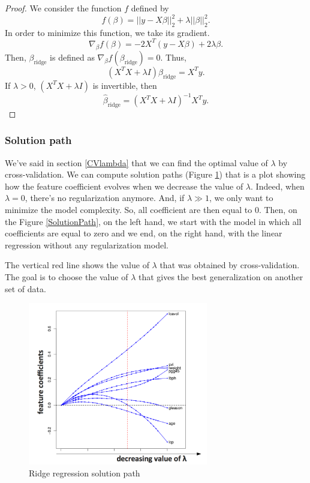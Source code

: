 \documentclass[a4paper,12pt]{article}
\begin{document}
\begin{proof}
We consider the function $f$ defined by
\[ f(\beta) = ||y - X\beta||_2^2 + \lambda ||\beta||_2^2.\]
In order to minimize this function, we take its gradient.
\[ \nabla_{\beta}f(\beta) = -2X^T (y-X\beta) + 2\lambda \beta.\]
Then, $\beta_\text{ridge}$ is defined as $\nabla_{\beta}f(\beta_{\text{ridge}}) = 0$. Thus,
\[ (X^TX+\lambda I)\beta_\text{ridge} = X^T y.\]
If $\lambda > 0$, $(X^T X + \lambda I)$ is invertible, then
\[ \hat{\beta}_\text{ridge} = (X^T X+ \lambda I)^{-1} X^T y. \]
\end{proof}

\subsubsection{Solution path}
\label{SectionSolutionPathRR}
We've said in section \ref{CVlambda} that we can find the optimal value of $\lambda$ by cross-validation. We can compute solution paths (Figure \ref{SolutionPathRR}) that is a plot showing how the feature coefficient evolves when we decrease the value of $\lambda$. Indeed, when $\lambda = 0$, there's no regularization anymore. And, if $\lambda \gg 1$, we only want to minimize the model complexity. So, all coefficient are then equal to $0$. Then, on the Figure \ref{SolutionPath}, on the left hand, we start with the model in which all coefficients are equal to zero and we end, on the right hand, with the linear regression without any regularization model.

The vertical red line shows the value of $\lambda$ that was obtained by cross-validation. The goal is to choose the value of $\lambda$ that gives the best generalization on another set of data.
\begin{figure}[!h]
\centerline{
\includegraphics[width = 0.7\textwidth]{figures/solution_path_ridge_regression.png}}
\caption{Ridge regression solution path}
\label{SolutionPathRR}
\end{figure}
\end{document}
